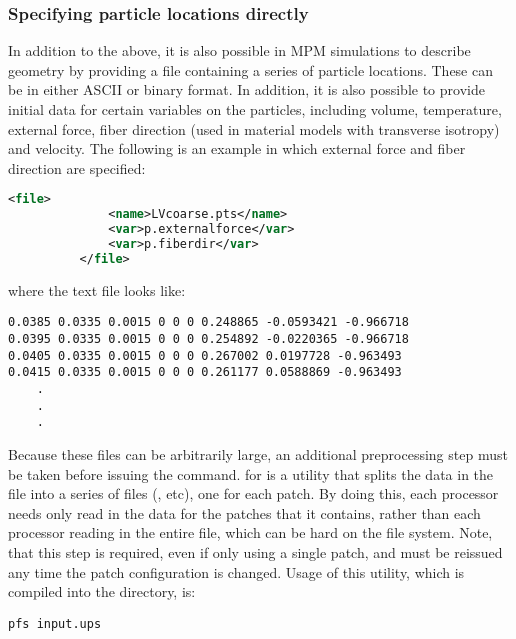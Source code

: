 \subsubsection{Specifying particle locations directly}
In addition to the above, it is also possible in MPM simulations to describe
geometry by providing a file containing a series of particle locations.  These
can be in either ASCII or binary format.  In addition, it is also possible to
provide initial data for certain variables on the particles, including
volume, temperature, external force, fiber direction (used in material models
with transverse isotropy) and velocity.  The following is an example in which
external force and fiber direction are specified:
\begin{lstlisting}[language=XML]
          <file>
              <name>LVcoarse.pts</name>
              <var>p.externalforce</var>
              <var>p.fiberdir</var>
          </file>
\end{lstlisting}
where the text file  looks like:
\begin{lstlisting}[backgroundcolor=\color{background}]
0.0385 0.0335 0.0015 0 0 0 0.248865 -0.0593421 -0.966718
0.0395 0.0335 0.0015 0 0 0 0.254892 -0.0220365 -0.966718
0.0405 0.0335 0.0015 0 0 0 0.267002 0.0197728 -0.963493
0.0415 0.0335 0.0015 0 0 0 0.261177 0.0588869 -0.963493
	.
	.
	.
\end{lstlisting}
Because these files can be arbitrarily large, an additional preprocessing step
must be taken before issuing the  command.
 for  is a utility that splits the
data in the  file into a series of files
(, etc), one for each
patch.  By doing this, each processor needs only read in the data for the
patches that it contains, rather than each processor reading in the entire file,
which can be hard on the file system.  Note, that this step is required,
even if only using a single patch, and must be reissued any time the patch
configuration is changed.  Usage of this utility, which is compiled
into the  directory, is:
\begin{lstlisting}[backgroundcolor=\color{background}]
   pfs input.ups
\end{lstlisting}

